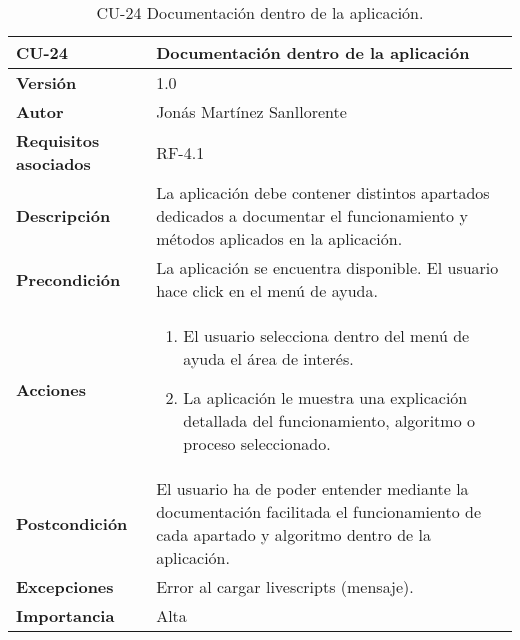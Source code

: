 \begin{table}[p]
	\centering
	\begin{tabularx}{\linewidth}{ p{} p{} }
		\toprule
		\textbf{CU-24}    & \textbf{Documentación dentro de la aplicación}\\
		\toprule
		\textbf{Versión}              & 1.0    \\
		\textbf{Autor}                & Jonás Martínez Sanllorente \\
		\textbf{Requisitos asociados} & RF-4.1 \\
		\textbf{Descripción}          & La aplicación debe contener distintos apartados dedicados a documentar el funcionamiento y métodos aplicados en la aplicación. \\
		\textbf{Precondición}         & La aplicación se encuentra disponible.\newline
                                        El usuario hace click en el menú de ayuda.\\
		\textbf{Acciones}             &
		\begin{enumerate}
			\def\labelenumi{\arabic{enumi}.}
			\tightlist
			\item El usuario selecciona dentro del menú de ayuda el área de interés.
            \item La aplicación le muestra una explicación detallada del funcionamiento, algoritmo o proceso seleccionado.
		\end{enumerate}\\
		\textbf{Postcondición}        & El usuario ha de poder entender mediante la documentación facilitada el funcionamiento de cada apartado y algoritmo dentro de la aplicación. \\
		\textbf{Excepciones}          & Error al cargar livescripts (mensaje).\\
		\textbf{Importancia}          & Alta \\
		\bottomrule
	\end{tabularx}
	\caption{CU-24 Documentación dentro de la aplicación.}
\end{table}

